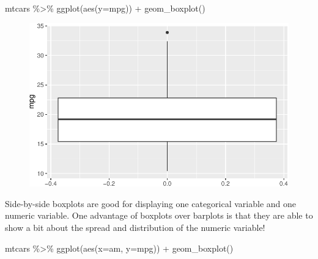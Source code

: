 \documentclass[
  letterpaper,
  DIV=11,
  numbers=noendperiod]{scrartcl}
\newenvironment{Shaded}{\begin{snugshade}}{\end{snugshade}}
\newcommand{\AttributeTok}[1]{\textcolor[rgb]{0.40,0.45,0.13}{#1}}
\newcommand{\FunctionTok}[1]{\textcolor[rgb]{0.28,0.35,0.67}{#1}}
\newcommand{\NormalTok}[1]{\textcolor[rgb]{0.00,0.23,0.31}{#1}}
\newcommand{\SpecialCharTok}[1]{\textcolor[rgb]{0.37,0.37,0.37}{#1}}
\begin{document}
\begin{Shaded}
\begin{Highlighting}[]
\NormalTok{mtcars }\SpecialCharTok{\%\textgreater{}\%} 
  \FunctionTok{ggplot}\NormalTok{(}\FunctionTok{aes}\NormalTok{(}\AttributeTok{y=}\NormalTok{mpg)) }\SpecialCharTok{+}
  \FunctionTok{geom\_boxplot}\NormalTok{()}
\end{Highlighting}
\end{Shaded}

\begin{figure}[H]

{\centering \includegraphics{118_F_ggplot2_files/figure-pdf/unnamed-chunk-6-1.pdf}

}

\end{figure}

\begin{tcolorbox}[enhanced jigsaw, arc=.35mm, title=\textcolor{quarto-callout-tip-color}{\faLightbulb}\hspace{0.5em}{Tip}, left=2mm, leftrule=.75mm, toptitle=1mm, opacitybacktitle=0.6, colframe=quarto-callout-tip-color-frame, coltitle=black, opacityback=0, breakable, toprule=.15mm, bottomtitle=1mm, titlerule=0mm, colback=white, rightrule=.15mm, bottomrule=.15mm, colbacktitle=quarto-callout-tip-color!10!white]

Side-by-side boxplots are good for displaying one categorical variable
and one numeric variable. One advantage of boxplots over barplots is
that they are able to show a bit about the spread and distribution of
the numeric variable!

\end{tcolorbox}

\begin{Shaded}
\begin{Highlighting}[]
\NormalTok{mtcars }\SpecialCharTok{\%\textgreater{}\%} 
  \FunctionTok{ggplot}\NormalTok{(}\FunctionTok{aes}\NormalTok{(}\AttributeTok{x=}\NormalTok{am, }\AttributeTok{y=}\NormalTok{mpg)) }\SpecialCharTok{+}
  \FunctionTok{geom\_boxplot}\NormalTok{()}
\end{Highlighting}
\end{Shaded}
\end{document}
